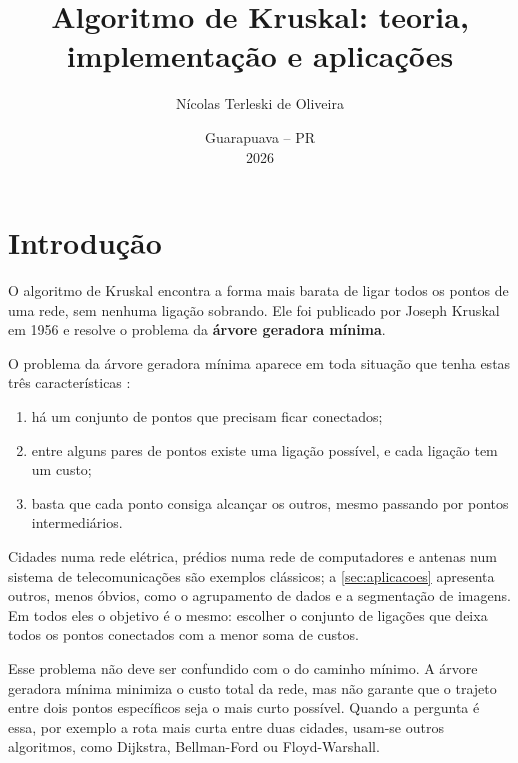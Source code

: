 \documentclass[a4paper]{article}
\title{Algoritmo de Kruskal: teoria, implementação e aplicações}
\author{Nícolas Terleski de Oliveira}
\date{Guarapuava -- PR \\ 2026}
\begin{document}
\makecover

\imprimirresumo

\sumario
\listadefiguras
\listadetabelas
\listadecodigos

\section{Introdução}
O algoritmo de Kruskal encontra a forma mais barata de ligar todos os pontos de
uma rede, sem nenhuma ligação sobrando. Ele foi publicado por Joseph Kruskal em
1956 \cite{kruskal1956} e resolve o problema da \textbf{árvore geradora mínima}.

O problema da árvore geradora mínima aparece em toda situação que tenha estas
três características \cite[cap.~23]{cormen2012}:
\begin{enumerate}
    \item há um conjunto de pontos que precisam ficar conectados;
    \item entre alguns pares de pontos existe uma ligação possível, e cada ligação tem um custo;
    \item basta que cada ponto consiga alcançar os outros, mesmo passando por pontos intermediários.
\end{enumerate}

Cidades numa rede elétrica, prédios numa rede de computadores e antenas num
sistema de telecomunicações são exemplos clássicos; a \cref{sec:aplicacoes}
apresenta outros, menos óbvios, como o agrupamento de dados e a segmentação de
imagens. Em todos eles o objetivo é o mesmo: escolher o conjunto de ligações que
deixa todos os pontos conectados com a menor soma de custos.

Esse problema não deve ser confundido com o do caminho mínimo. A árvore geradora
mínima minimiza o custo total da rede, mas não garante que o trajeto entre dois
pontos específicos seja o mais curto possível. Quando a pergunta é essa, por
exemplo a rota mais curta entre duas cidades, usam-se outros algoritmos, como
Dijkstra, Bellman-Ford ou Floyd-Warshall.
\end{document}
